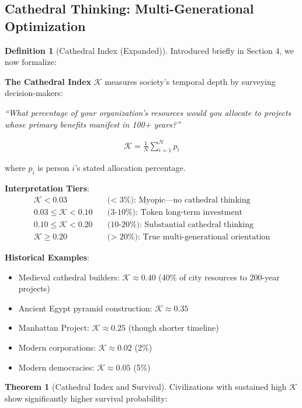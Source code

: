 \documentclass[11pt,a4paper]{article}
\theoremstyle{definition}
\newtheorem{definition}{Definition}[section]
\newtheorem{theorem}{Theorem}[section]
\theoremstyle{remark}
\begin{document}
\begin{enumerate}
\subsection{Cathedral Thinking: Multi-Generational Optimization}

\begin{definition}[Cathedral Index (Expanded)]
Introduced briefly in Section 4, we now formalize:

\textbf{The Cathedral Index} \(\mathcal{K}\) measures society's temporal depth by surveying decision-makers:

\textit{``What percentage of your organization's resources would you allocate to projects whose primary benefits manifest in 100+ years?''}

\begin{align}
\mathcal{K} = \frac{1}{N} \sum_{i=1}^N p_i
\end{align}

where \(p_i\) is person \(i\)'s stated allocation percentage.

\textbf{Interpretation Tiers}:
\begin{align}
\mathcal{K} < 0.03 &\quad \text{(< 3\%): Myopic—no cathedral thinking} \\
0.03 \leq \mathcal{K} < 0.10 &\quad \text{(3-10\%): Token long-term investment} \\
0.10 \leq \mathcal{K} < 0.20 &\quad \text{(10-20\%): Substantial cathedral thinking} \\
\mathcal{K} \geq 0.20 &\quad \text{(> 20\%): True multi-generational orientation}
\end{align}

\textbf{Historical Examples}:
\begin{itemize}
    \item Medieval cathedral builders: \(\mathcal{K} \approx 0.40\) (40\% of city resources to 200-year projects)
    \item Ancient Egypt pyramid construction: \(\mathcal{K} \approx 0.35\)
    \item Manhattan Project: \(\mathcal{K} \approx 0.25\) (though shorter timeline)
    \item Modern corporations: \(\mathcal{K} \approx 0.02\) (2\%)
    \item Modern democracies: \(\mathcal{K} \approx 0.05\) (5\%)
\end{itemize}
\end{definition}

\begin{theorem}[Cathedral Index and Survival]
Civilizations with sustained high \(\mathcal{K}\) show significantly higher survival probability:


\end{theorem}
\end{enumerate}
\end{document}
